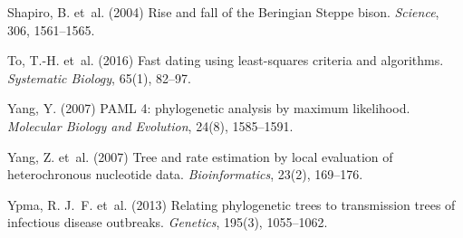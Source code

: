 \documentclass{bioinfo}
\begin{document}
\begin{thebibliography}{14}
Shapiro, B. et~al. (2004) Rise and fall of the {Beringian Steppe} bison.
\newblock \emph{Science}, 306, 1561--1565.

To, T.-H. et~al. (2016) Fast dating using least-squares criteria and
  algorithms.
\newblock \emph{Systematic Biology}, 65(1), 82--97.

Yang, Y. (2007) {PAML} 4: phylogenetic analysis by maximum likelihood.
\newblock \emph{Molecular Biology and Evolution}, 24(8), 1585--1591.

Yang, Z. et~al. (2007) Tree and rate estimation by local evaluation of
  heterochronous nucleotide data.
\newblock \emph{Bioinformatics}, 23(2), 169--176.

Ypma, R. J.~F. et~al. (2013) Relating phylogenetic trees to transmission trees
  of infectious disease outbreaks.
\newblock \emph{Genetics}, 195(3), 1055--1062.

\end{thebibliography}
\end{document}
